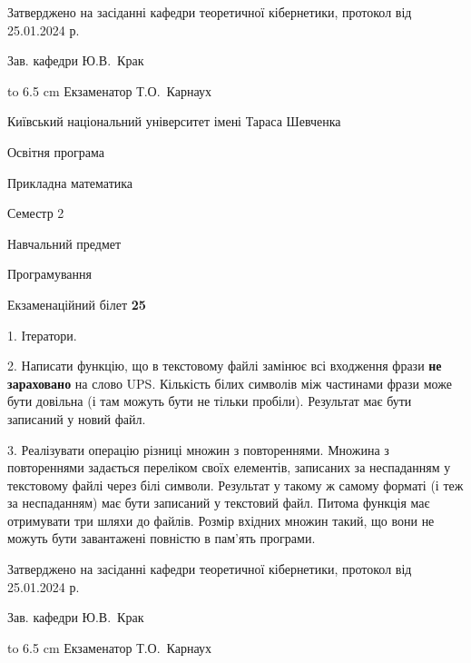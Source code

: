 \documentclass[12pt, ukrainian]{article}
\begin{document}
{\smallskip\smallskip \begin {scriptsize} Затверджено на засіданні кафедри теоретичної кібернетики, протокол   від   25.01.2024 р.\par\smallskip\smallskip\smallskip\smallskip
{\parbox {6.5 cm} {Зав. кафедри \dotfill Ю.В.~Крак}}\hspace {0.7cm} {\hbox to 6.5 cm { Екзаменатор \dotfill Т.О.~Карнаух}} \end{scriptsize}}
\newpage
{{\begin {scriptsize}\par
{ \center  Київський національний університет імені Тараса Шевченка \par}
{\parbox {5 cm}{Освітня програма \hfill}{\parbox {7 cm}{Прикладна математика\hfill}}\parbox {6 cm}{\hfill Семестр 2}}\par
{\parbox {5 cm} {Навчальний предмет \hfill}\parbox {7 cm}{Програмування \hfill}\parbox {6cm}{\hfill}\par}\vspace{-15pt} \end{scriptsize}}{\center Екзаменаційний білет \No \textbf { 25 }\par}}
{%
1. Ітератори.%
\par
2. Написати функцію, що в текстовому файлі замінює всі входження фрази \textbf{не зараховано} на слово UPS. Кількість білих символів між частинами фрази може бути довільна (і там можуть бути не тільки пробіли). Результат має бути записаний у новий файл.

\par
3. Реалізувати операцію різниці множин з повтореннями. Множина з повтореннями задається переліком своїх елементів, записаних за неспаданням у текстовому файлі через білі символи. Результат у такому ж самому форматі (і теж за неспаданням) має бути записаний у текстовий файл. Питома функція має отримувати три шляхи до файлів. Розмір вхідних множин такий, що вони не можуть бути завантажені повністю в пам’ять програми.

}
{\smallskip\smallskip \begin {scriptsize} Затверджено на засіданні кафедри теоретичної кібернетики, протокол   від   25.01.2024 р.\par\smallskip\smallskip\smallskip\smallskip
{\parbox {6.5 cm} {Зав. кафедри \dotfill Ю.В.~Крак}}\hspace {0.7cm} {\hbox to 6.5 cm { Екзаменатор \dotfill Т.О.~Карнаух}} \end{scriptsize}}
\vspace{0.9cm}
\end{document}
